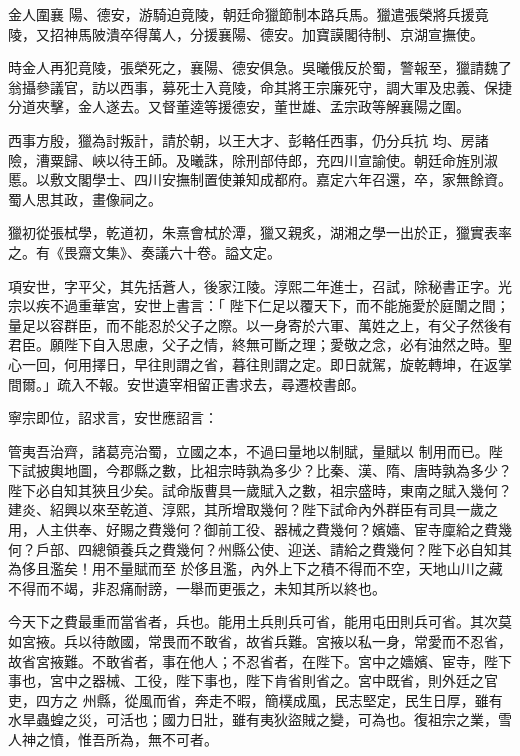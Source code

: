 \begin{pinyinscope}
 金人圍襄
 陽、德安，游騎迫竟陵，朝廷命獵節制本路兵馬。獵遣張榮將兵援竟陵，又招神馬陂潰卒得萬人，分援襄陽、德安。加寶謨閣待制、京湖宣撫使。



 時金人再犯竟陵，張榮死之，襄陽、德安俱急。吳曦俄反於蜀，警報至，獵請魏了翁攝參議官，訪以西事，募死士入竟陵，命其將王宗廉死守，調大軍及忠義、保捷分道夾擊，金人遂去。又督董逵等援德安，董世雄、孟宗政等解襄陽之圍。



 西事方殷，獵為討叛計，請於朝，以王大才、彭輅任西事，仍分兵抗
 均、房諸險，漕粟歸、峽以待王師。及曦誅，除刑部侍郎，充四川宣諭使。朝廷命旌別淑慝。以敷文閣學士、四川安撫制置使兼知成都府。嘉定六年召還，卒，家無餘資。蜀人思其政，畫像祠之。



 獵初從張栻學，乾道初，朱熹會栻於潭，獵又親炙，湖湘之學一出於正，獵實表率之。有《畏齋文集》、奏議六十卷。謚文定。



 項安世，字平父，其先括蒼人，後家江陵。淳熙二年進士，召試，除秘書正字。光宗以疾不過重華宮，安世上書言：「
 陛下仁足以覆天下，而不能施愛於庭闈之間；量足以容群臣，而不能忍於父子之際。以一身寄於六軍、萬姓之上，有父子然後有君臣。願陛下自入思慮，父子之情，終無可斷之理；愛敬之念，必有油然之時。聖心一回，何用擇日，早往則謂之省，暮往則謂之定。即日就駕，旋乾轉坤，在返掌間爾。」疏入不報。安世遺宰相留正書求去，尋遷校書郎。



 寧宗即位，詔求言，安世應詔言：



 管夷吾治齊，諸葛亮治蜀，立國之本，不過曰量地以制賦，量賦以
 制用而已。陛下試披輿地圖，今郡縣之數，比祖宗時孰為多少？比秦、漢、隋、唐時孰為多少？陛下必自知其狹且少矣。試命版曹具一歲賦入之數，祖宗盛時，東南之賦入幾何？建炎、紹興以來至乾道、淳熙，其所增取幾何？陛下試命內外群臣有司具一歲之用，人主供奉、好賜之費幾何？御前工役、器械之費幾何？嬪嬙、宦寺廩給之費幾何？戶部、四總領養兵之費幾何？州縣公使、迎送、請給之費幾何？陛下必自知其為侈且濫矣！用不量賦而至
 於侈且濫，內外上下之積不得而不空，天地山川之藏不得而不竭，非忍痛耐謗，一舉而更張之，未知其所以終也。



 今天下之費最重而當省者，兵也。能用土兵則兵可省，能用屯田則兵可省。其次莫如宮掖。兵以待敵國，常畏而不敢省，故省兵難。宮掖以私一身，常愛而不忍省，故省宮掖難。不敢省者，事在他人；不忍省者，在陛下。宮中之嬙嬪、宦寺，陛下事也，宮中之器械、工役，陛下事也，陛下肯省則省之。宮中既省，則外廷之官吏，四方之
 州縣，從風而省，奔走不暇，簡樸成風，民志堅定，民生日厚，雖有水旱蟲蝗之災，可活也；國力日壯，雖有夷狄盜賊之變，可為也。復祖宗之業，雪人神之憤，惟吾所為，無不可者。




\end{pinyinscope}
